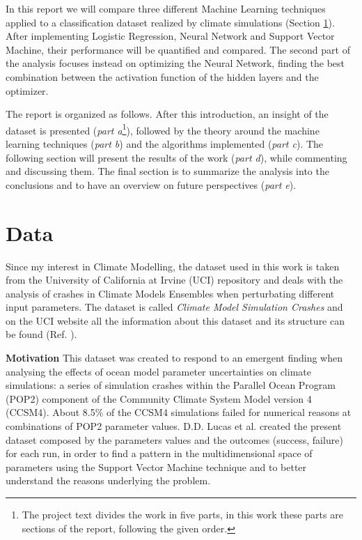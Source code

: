 \documentclass[english,notitlepage,reprint,nofootinbib]{revtex4-1}  %
\begin{document}
In this report we will compare three different Machine Learning techniques applied to a classification dataset realized by climate simulations (Section \ref{sec:data}). After implementing Logistic Regression, Neural Network and Support Vector Machine, their performance will be quantified and compared. The second part of the analysis focuses instead on optimizing the Neural Network, finding the best combination between the activation function of the hidden layers and the optimizer.

The report is organized as follows. After this introduction, an insight of the dataset is presented (\textit{part a}\footnote{The project text divides the work in five parts, in this work these parts are sections of the report, following the given order.}), followed by the theory around the machine learning techniques (\textit{part b}) and the algorithms implemented (\textit{part c}). The following section will present the results of the work (\textit{part d}), while commenting and discussing them. The final section is to summarize the analysis into the conclusions and to have an overview on future perspectives (\textit{part e}).


    
\section{Data}\label{sec:data} 

Since my interest in Climate Modelling, the dataset used in this work is taken from the University of California at Irvine (UCI) repository   and deals with the analysis of crashes in Climate Models Ensembles when perturbating different input parameters. The dataset is called \textit{Climate Model Simulation Crashes} and on the UCI website all the information about this dataset and its structure can be found (Ref. \cite{UCI}).


\textbf{Motivation} 
This dataset was created to respond to an emergent finding when analysing the effects of ocean model parameter uncertainties on climate simulations: a series of simulation crashes within the Parallel Ocean Program (POP2) component of the Community Climate System Model version 4 (CCSM4). About 8.5\% of the CCSM4 simulations failed for numerical reasons at combinations of POP2 parameter values. D.D. Lucas et al. \cite{failure} created the present dataset composed by the parameters values and the outcomes (success, failure) for each run, in order to find a pattern in the multidimensional space of parameters using the Support Vector Machine technique and to better understand the reasons underlying the problem.
\end{document}
